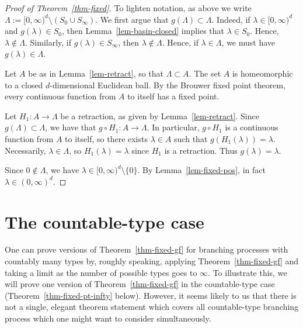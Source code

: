 \documentclass[11pt]{article}
\theoremstyle{plain}
\theoremstyle{definition}
\numberwithin{equation}{section}
\begin{document}
\begin{proof}[Proof of Theorem~\ref{thm-fixed}]
To lighten notation, as above we write $\Lambda := [0,\infty)^d \setminus (S_0 \cup S_\infty)$. 
We first argue that $g(\Lambda) \subset \Lambda$. Indeed, if $\lambda\in [0,\infty)^d$ and $g(\lambda ) \in S_0$, then Lemma~\ref{lem-basin-closed} implies that $\lambda \in S_0$. Hence, $\lambda \notin \Lambda$. Similarly, if $g(\lambda) \in S_\infty$, then $\lambda \notin \Lambda$. Hence, if $\lambda\in\Lambda$, we must have $g(\lambda)\in\Lambda$.  

Let $A$ be as in Lemma~\ref{lem-retract}, so that $\Lambda\subset A$. The set $A$ is homeomorphic to a closed $d$-dimensional Euclidean ball. 
By the Brouwer fixed point theorem, every continuous function from $A$ to itself has a fixed point. 

Let $H_1 : A \to \Lambda$ be a retraction, as given by Lemma~\ref{lem-retract}. 
Since $g(\Lambda)\subset\Lambda$, we have that $g\circ H_1 : A \to \Lambda$. In particular, $g\circ H_1$ is a continuous function from $A$ to itself, so there exists $\lambda \in A$ such that $g(H_1(\lambda)) = \lambda$. Necessarily, $\lambda\in\Lambda$, so $H_1(\lambda) = \lambda$ since $H_1$ is a retraction. Thus $g(\lambda) = \lambda$. 

Since $0\notin \Lambda$, we have $\lambda \in [0,\infty)^d \setminus \{0\}$. By Lemma~\ref{lem-fixed-pos}, in fact $\lambda \in (0,\infty)^d$.  
\end{proof}


\section{The countable-type case}
\label{sec-infty}

One can prove versions of Theorem~\ref{thm-fixed-gf} for branching processes with countably many types by, roughly speaking, applying Theorem~\ref{thm-fixed-gf} and taking a limit as the number of possible types goes to $\infty$. To illustrate this, we will prove one version of Theorem~\ref{thm-fixed-gf} in the countable-type case (Theorem~\ref{thm-fixed-pt-infty} below). However, it seems likely to us that there is not a single, elegant theorem statement which covers all countable-type branching process which one might want to consider simultaneously. 
\end{document}

